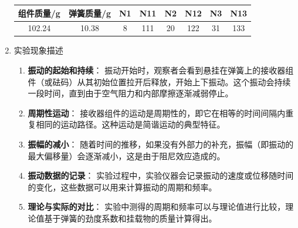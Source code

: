 \documentclass[dvipsnames, svgnames,a4paper,11pt]{article}
\begin{document}
\begin{enumerate}
\begin{table}[h]
			\begin{tabular}{|c|c|c|c|c|c|c|c|}
				\hline
				组件质量/g & 弹簧质量/g & N1 & N11 & N2 & N12 & N3 & N13 \\
				\hline
				102.24 & 10.38 & 8 & 111 & 20 & 122 & 31 & 133 \\
				\hline
			\end{tabular}						
		\end{table}						
		
		\item 实验现象描述
		\begin{enumerate}
			\item \textbf{振动的起始和持续}：
			振动开始时，观察者会看到悬挂在弹簧上的接收器组件（或砝码）从其初始位置拉开后释放，开始上下振动。这个振动会持续一段时间，直到由于空气阻力和内部摩擦逐渐减弱停止。
			
			\item \textbf{周期性运动}：
			接收器组件的运动是周期性的，即它在相等的时间间隔内重复相同的运动路径。这种运动是简谐运动的典型特征。
			
			\item \textbf{振幅的减小}：
			随着时间的推移，如果没有外部力的补充，振幅（即振动的最大偏移量）会逐渐减小，这是由于阻尼效应造成的。
			
			\item \textbf{振动数据的记录}：
			实验过程中，实验仪器会记录振动的速度或位移随时间的变化，这些数据可以用来计算振动的周期和频率。
			
			\item \textbf{理论与实际的对比}：
			实验中测得的周期和频率可以与理论值进行比较，理论值基于弹簧的劲度系数和挂载物的质量计算得出。
		\end{enumerate}
		
	\end{enumerate}
	
\end{document}
